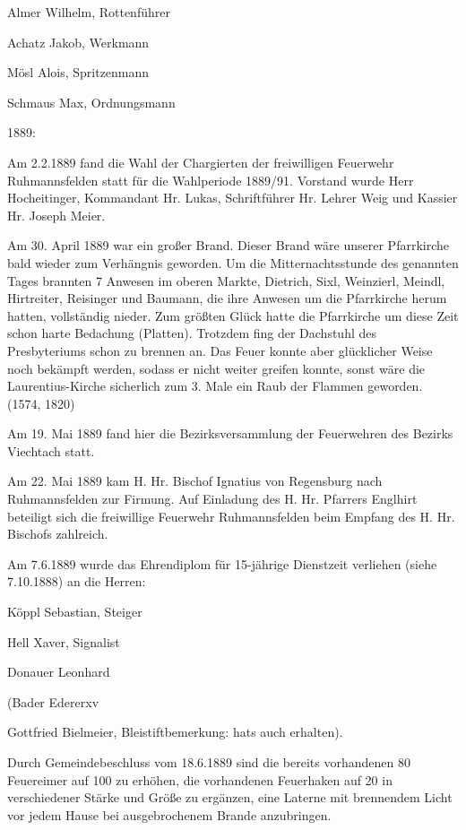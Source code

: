 \documentclass{book}
\begin{document}
Almer Wilhelm, Rottenführer

Achatz Jakob, Werkmann

Mösl Alois, Spritzenmann

Schmaus Max, Ordnungsmann



1889:

Am 2.2.1889 fand die Wahl der Chargierten der freiwilligen Feuerwehr
Ruhmannsfelden statt für die Wahlperiode 1889/91. Vorstand wurde Herr
Hocheitinger, Kommandant Hr. Lukas, Schriftführer Hr. Lehrer Weig und Kassier
Hr. Joseph Meier.

Am 30. April 1889 war ein großer Brand. Dieser Brand wäre unserer Pfarrkirche
bald wieder zum Verhängnis geworden. Um die Mitternachtsstunde des genannten
Tages brannten 7 Anwesen im oberen Markte, Dietrich, Sixl, Weinzierl, Meindl,
Hirtreiter, Reisinger und Baumann, die ihre Anwesen um die Pfarrkirche herum
hatten, vollständig nieder. Zum größten Glück hatte die Pfarrkirche um diese
Zeit schon harte Bedachung (Platten). Trotzdem fing der Dachstuhl des
Presbyteriums schon zu brennen an. Das Feuer konnte aber glücklicher Weise noch
bekämpft werden, sodass er nicht weiter greifen konnte, sonst wäre die
Laurentius-Kirche sicherlich zum 3. Male ein Raub der Flammen geworden. (1574,
1820)

Am 19. Mai 1889 fand hier die Bezirksversammlung der Feuerwehren des Bezirks
Viechtach statt.

Am 22. Mai 1889 kam H. Hr. Bischof Ignatius von Regensburg nach Ruhmannsfelden
zur Firmung. Auf Einladung des H. Hr. Pfarrers Englhirt beteiligt sich die
freiwillige Feuerwehr Ruhmannsfelden beim Empfang des H. Hr. Bischofs zahlreich.

Am 7.6.1889 wurde das Ehrendiplom für 15-jährige Dienstzeit verliehen (siehe
7.10.1888) an die Herren:



Köppl Sebastian, Steiger

Hell Xaver, Signalist

Donauer Leonhard

(Bader Edererxv

Gottfried Bielmeier, Bleistiftbemerkung: hats auch erhalten).



Durch Gemeindebeschluss vom 18.6.1889 sind die bereits vorhandenen 80 Feuereimer
auf 100 zu erhöhen, die vorhandenen Feuerhaken auf 20 in verschiedener Stärke
und Größe zu ergänzen, eine Laterne mit brennendem Licht vor jedem Hause bei
ausgebrochenem Brande anzubringen.
\end{document}
